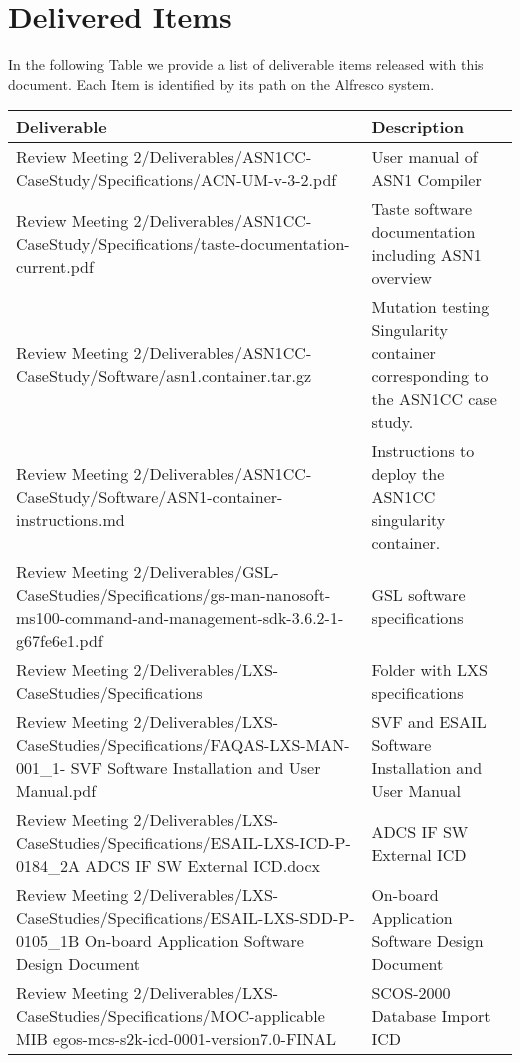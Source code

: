 
\section*{Delivered Items}
\label{sec:deliverables}

In the following Table we provide a list of deliverable items released with this document. Each Item is identified by its path on the Alfresco system. 

\setlength\LTleft{0pt}
\setlength\LTright{0pt}
\tiny 
\begin{longtable}{|p{8cm}|p{8cm}@{}|}
\label{table:deliverables} \\
\hline
\textbf{Deliverable}&Description\\
\hline
 Review Meeting 2/Deliverables/ASN1CC-CaseStudy/Specifications/ACN-UM-v-3-2.pdf&User manual of ASN1 Compiler\\
 Review Meeting 2/Deliverables/ASN1CC-CaseStudy/Specifications/taste-documentation-current.pdf&Taste software documentation including ASN1 overview\\
 Review Meeting 2/Deliverables/ASN1CC-CaseStudy/Software/asn1.container.tar.gz&Mutation testing Singularity container corresponding to the ASN1CC case study.\\
 Review Meeting 2/Deliverables/ASN1CC-CaseStudy/Software/ASN1-container-instructions.md&Instructions to deploy the ASN1CC singularity container.\\
\hline
 Review Meeting 2/Deliverables/GSL-CaseStudies/Specifications/gs-man-nanosoft-ms100-command-and-management-sdk-3.6.2-1-g67fe6e1.pdf&GSL software specifications\\
\hline
 Review Meeting 2/Deliverables/LXS-CaseStudies/Specifications&Folder with LXS specifications\\
 Review Meeting 2/Deliverables/LXS-CaseStudies/Specifications/FAQAS-LXS-MAN-001\_1- SVF Software Installation and User Manual.pdf&SVF and ESAIL Software Installation and User Manual\\
 Review Meeting 2/Deliverables/LXS-CaseStudies/Specifications/ESAIL-LXS-ICD-P-0184\_2A ADCS IF SW External ICD.docx&ADCS IF SW External ICD\\
 Review Meeting 2/Deliverables/LXS-CaseStudies/Specifications/ESAIL-LXS-SDD-P-0105\_1B On-board Application Software Design Document&On-board Application Software Design Document\\
 Review Meeting 2/Deliverables/LXS-CaseStudies/Specifications/MOC-applicable MIB egos-mcs-s2k-icd-0001-version7.0-FINAL&SCOS-2000 Database Import ICD\\

\end{longtable}
